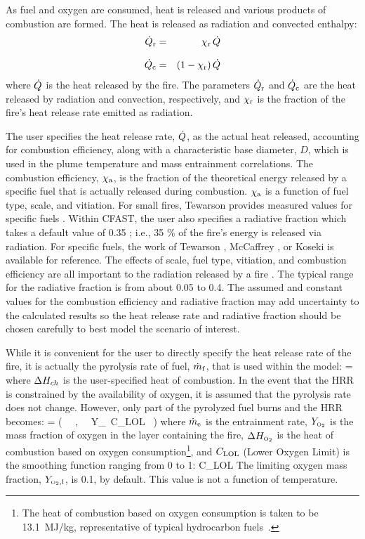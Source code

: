 \documentclass[12pt]{book}
\begin{document}
As fuel and oxygen are consumed, heat is released and various products of combustion are formed. The heat is released as radiation and convected enthalpy:
\begin{eqnarray}
   \dot{Q}_{\rm r} &=& \chi_{\rm r} \, \dot{Q} \\[.1in]
   \dot{Q}_{\rm c} &=& (1-\chi_{\rm r}) \, \dot{Q} \\
\end{eqnarray}
where $\dot{Q}$ is the heat released by the fire. The parameters $\dot{Q}_{\rm r}$ and $\dot{Q}_{\rm c}$ are the heat released by radiation and convection, respectively, and $\chi_{\rm r}$ is the fraction of the fire's heat release rate emitted as radiation.

The user specifies the heat release rate, $\dot{Q}$, as the actual heat released, accounting for combustion efficiency, along with a characteristic base diameter, $D$, which is used in the plume temperature and mass entrainment correlations. The combustion efficiency, $\chi_{\rm a}$, is the fraction of the theoretical energy released by a specific fuel that is actually released during combustion. $\chi_{\rm a}$ is a function of fuel type, scale, and vitiation. For small fires, Tewarson provides measured values for specific fuels \cite{Tewarson:2003}. Within CFAST, the user also specifies a radiative fraction which takes a default value of 0.35 ; i.e., 35 \% of the fire's energy is released via radiation.  For specific fuels, the work of Tewarson \cite{Tewarson:2003}, McCaffrey \cite{McCaffrey:1982}, or Koseki \cite{Koseki:1989} is available for reference. The effects of scale, fuel type, vitiation, and combustion efficiency are all important to the radiation released by a fire \cite{Hamins:1991, Hamins:1994}. The typical range for the radiative fraction is from about 0.05 to 0.4. The assumed and constant values for the combustion efficiency and radiative fraction may add uncertainty to the calculated results so the heat release rate and radiative fraction should be chosen carefully to best model the scenario of interest.

While it is convenient for the user to directly specify the heat release rate of the fire, it is actually the pyrolysis rate of fuel, $\dot{m}_{\rm f}$, that is used within the model:
\be
   \dmf = \frac{\dQ}{\Dh}
\ee
where $\Delta H_{ch}$ is the user-specified heat of combustion. In the event that the HRR is constrained by the availability of oxygen, it is assumed that the pyrolysis rate does not change. However, only part of the pyrolyzed fuel burns and the HRR becomes:
\be
   \dQ = \min \Big( \dmf \, \Dh \, , \, \dme \, Y_\OTWO \, C_{\rm LOL} \, \DhO \Big)
\ee
where $\dot{m}_{\rm e}$ is the entrainment rate, $Y_{\tiny \hbox{O}_2}$ is the mass fraction of oxygen in the layer containing the fire, $\Delta H_{\tiny \hbox{O}_2}$ is the heat of combustion based on oxygen consumption\footnote{The heat of combustion based on oxygen consumption is taken to be 13.1~MJ/kg, representative of typical hydrocarbon fuels~\cite{Huggett:1980}.}, and $C_{\rm LOL}$ (Lower Oxygen Limit) is the smoothing function ranging from 0 to 1:
\be
   C_{\rm LOL} \approx {}
\ee
The limiting oxygen mass fraction, $Y_{{\tiny \hbox{O}_2},{\rm l}}$, is 0.1, by default. This value is not a function of temperature.
\end{document}
